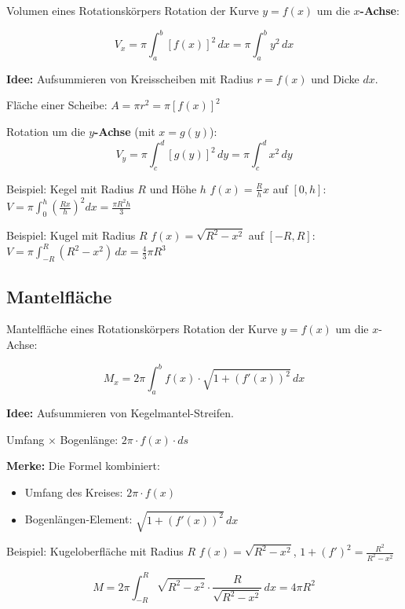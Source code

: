 \documentclass[a4paper,fontsize = 7pt]{scrartcl}
\begin{document}
\begin{mainbox}{Volumen eines Rotationskörpers}
Rotation der Kurve $y = f(x)$ um die \textbf{$x$-Achse}:

$$\boxed{V_x = \pi \int_a^b \left[f(x)\right]^2\,dx = \pi \int_a^b y^2\,dx}$$

\textbf{Idee:} Aufsummieren von Kreisscheiben mit Radius $r = f(x)$ und Dicke $dx$.

Fläche einer Scheibe: $A = \pi r^2 = \pi [f(x)]^2$

Rotation um die \textbf{$y$-Achse} (mit $x = g(y)$):
$$V_y = \pi \int_c^d \left[g(y)\right]^2\,dy = \pi \int_c^d x^2\,dy$$
\end{mainbox}

\begin{subbox}{Beispiel: Kegel mit Radius $R$ und Höhe $h$}
$f(x) = \frac{R}{h}x$ auf $[0, h]$: $V = \pi \int_0^h \left(\frac{Rx}{h}\right)^2 dx = \frac{\pi R^2 h}{3}$
\end{subbox}

\begin{subbox}{Beispiel: Kugel mit Radius $R$}
$f(x) = \sqrt{R^2 - x^2}$ auf $[-R, R]$: $V = \pi \int_{-R}^{R} (R^2 - x^2)\,dx = \frac{4}{3}\pi R^3$
\end{subbox}

\subsection{Mantelfläche}

\begin{mainbox}{Mantelfläche eines Rotationskörpers}
Rotation der Kurve $y = f(x)$ um die $x$-Achse:

$$\boxed{M_x = 2\pi \int_a^b f(x) \cdot \sqrt{1 + \left(f'(x)\right)^2}\,dx}$$

\textbf{Idee:} Aufsummieren von Kegelmantel-Streifen.

Umfang $\times$ Bogenlänge: $2\pi \cdot f(x) \cdot ds$

\textbf{Merke:} Die Formel kombiniert:
\begin{itemize}
	\item Umfang des Kreises: $2\pi \cdot f(x)$
	\item Bogenlängen-Element: $\sqrt{1 + (f'(x))^2}\,dx$
\end{itemize}
\end{mainbox}

\begin{subbox}{Beispiel: Kugeloberfläche mit Radius $R$}
$f(x) = \sqrt{R^2 - x^2}$, \quad $1 + (f')^2 = \frac{R^2}{R^2-x^2}$

$$M = 2\pi \int_{-R}^{R} \sqrt{R^2-x^2} \cdot \frac{R}{\sqrt{R^2-x^2}}\,dx = 4\pi R^2$$
\end{subbox}
\end{document}
